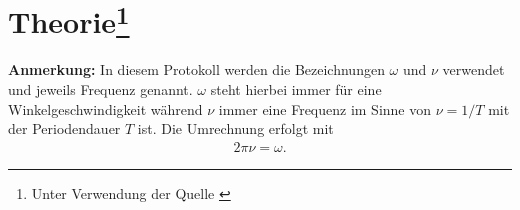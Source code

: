

\section[Theorie]{Theorie\footnote{Unter Verwendung der Quelle \cite{man:v354}}}
\textbf{Anmerkung:} In diesem Protokoll werden die Bezeichnungen $\omega$ und $\nu$ verwendet und jeweils Frequenz genannt.
$\omega$ steht hierbei immer für eine Winkelgeschwindigkeit während $\nu$ immer eine Frequenz im Sinne von $\nu = 1/T$ mit
der Periodendauer $T$ ist. Die Umrechnung erfolgt mit
\begin{align*}
    2 \pi \nu = \omega .
\end{align*}


